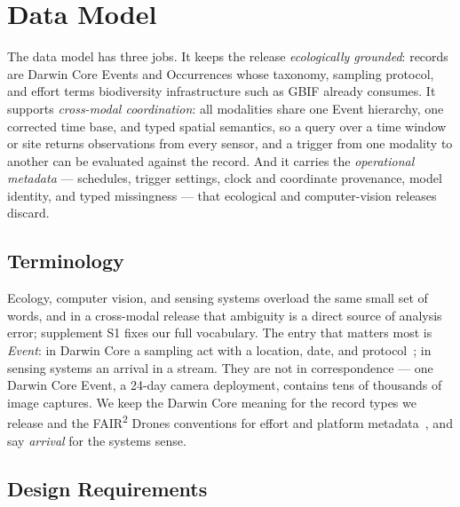 \documentclass[sigconf]{acmart}
\begin{document}
\section{Data Model}
\label{sec:model}

The data model has three jobs. It keeps the release \emph{ecologically
grounded}: records are Darwin Core Events and Occurrences whose
taxonomy, sampling protocol, and effort terms biodiversity
infrastructure such as GBIF already consumes. It supports
\emph{cross-modal coordination}: all modalities share one Event
hierarchy, one corrected time base, and typed spatial semantics, so a
query over a time window or site returns observations from every sensor,
and a trigger from one modality to another can be evaluated against the
record. And it carries the \emph{operational metadata} --- schedules,
trigger settings, clock and coordinate provenance, model identity, and
typed missingness --- that ecological and computer-vision releases
discard.

\subsection{Terminology}
\label{sec:glossary}

Ecology, computer vision, and sensing systems overload the same small
set of words, and in a cross-modal release that ambiguity is a direct
source of analysis error; supplement S1 fixes our full vocabulary.
The entry that matters most is \emph{Event}: in Darwin Core a sampling
act with a location, date, and
protocol~\cite{wieczorek2012darwincore,tdwgDarwinCore}; in sensing
systems an arrival in a stream. They are not in correspondence --- one
Darwin Core Event, a 24-day camera deployment, contains tens of
thousands of image captures. We keep the Darwin Core meaning for the
record types we release and the FAIR\textsuperscript{2} Drones
conventions for effort and platform
metadata~\cite{pierrat2025proximal}, and say \emph{arrival} for the
systems sense.


\subsection{Design Requirements}
\end{document}
